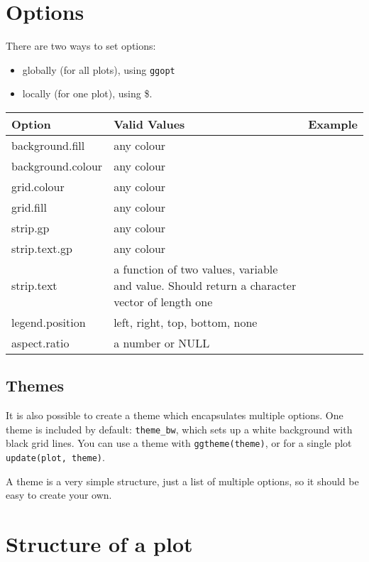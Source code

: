 \section{Options}\label{sec:options}

There are two ways to set options:

\begin{itemize}
  \item globally (for all plots), using {\tt ggopt}
  \item locally (for one plot), using \$. 
\end{itemize}     
                 
\begin{tabular}{lp{1.5in}l}
Option & Valid Values & Example \\
\hline
background.fill    & any colour
& \\
background.colour  & any colour
& \\
grid.colour        & any colour
& \\
grid.fill          & any colour
& \\
strip.gp           & any colour 
& \\
strip.text.gp      & any colour
& \\
strip.text         & a function of two values, variable and value.  Should return a character vector of length one
& \\
legend.position    & left, right, top, bottom, none
& \\
aspect.ratio       & a number or NULL
& \\
\hline
\end{tabular}

\subsection{Themes}\label{sub:themes}

It is also possible to create a theme which encapsulates multiple options.  One theme is included by default: {\tt theme\_bw}, which sets up a white background with black grid lines.  You can use a theme with {\tt ggtheme(theme)}, or for a single plot {\tt update(plot, theme)}.



A theme is a very simple structure, just a list of multiple options, so it should be easy to create your own.

\newpage
\section{Structure of a plot}\label{sec:structure_of_a_plot}

